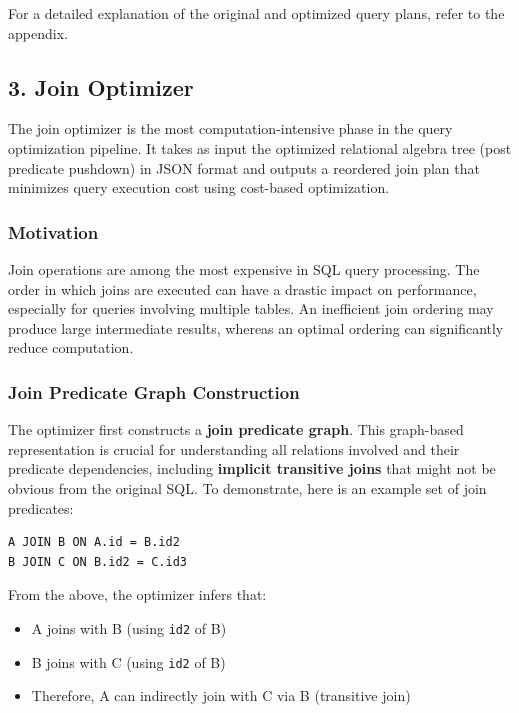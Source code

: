 \documentclass[12pt]{article}
\begin{document}
For a detailed explanation of the original and optimized query plans, refer to the appendix.

\subsection*{3. Join Optimizer}

The join optimizer is the most computation-intensive phase in the query optimization pipeline. It takes as input the optimized relational algebra tree (post predicate pushdown) in JSON format and outputs a reordered join plan that minimizes query execution cost using cost-based optimization.

\subsubsection*{Motivation}

Join operations are among the most expensive in SQL query processing. The order in which joins are executed can have a drastic impact on performance, especially for queries involving multiple tables. An inefficient join ordering may produce large intermediate results, whereas an optimal ordering can significantly reduce computation.

\subsubsection*{Join Predicate Graph Construction}

The optimizer first constructs a \textbf{join predicate graph}. This graph-based representation is crucial for understanding all relations involved and their predicate dependencies, including \textbf{implicit transitive joins} that might not be obvious from the original SQL.
To demonstrate, here is an example set of join predicates:
\begin{verbatim}
A JOIN B ON A.id = B.id2
B JOIN C ON B.id2 = C.id3
\end{verbatim}

\vspace{2em}
From the above, the optimizer infers that:
\begin{itemize}
    \item A joins with B (using \texttt{id2} of B)
    \item B joins with C (using \texttt{id2} of B)
    \item Therefore, A can indirectly join with C via B (transitive join)
\end{itemize}
\end{document}
